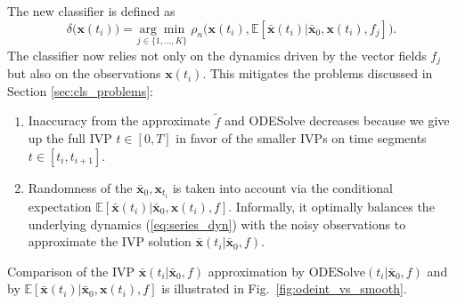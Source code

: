 \documentclass[referee, pdflatex, sn-mathphys-num]{sn-jnl}
\theoremstyle{definition}
\theoremstyle{plain}
\newcommand{\bx}{\ensuremath{\mathbf{x}}}
\newcommand{\bbx}{\ensuremath{\bar{\mathbf{x}}}}
\begin{document}
	The new classifier is defined as
	\begin{equation}\label{def:new_classifier}
		\delta \big( \bx(t_i) \big) = \underset{j \in \{1, \ldots, K\}}{\arg\min} \ \rho_n\big( \bx(t_i), \mathbb{E}[\bbx(t_i) | \bbx_0, \bx(t_i), f_j] \big).
	\end{equation}
	The classifier now relies not only on the dynamics driven by the vector fields $f_j$ but also on the observations $\bx(t_i)$. This mitigates the problems discussed in Section \ref{sec:cls_problems}:
	\begin{enumerate}
		\item Inaccuracy from the approximate $\tilde{f}$ and ODESolve decreases because we give up the full IVP $t \in [0, T]$ in favor of the smaller IVPs on time segments $t \in [t_i, t_{i+1}]$.
		\item Randomness of the $\bbx_0, \bx_{t_i}$ is taken into account via the conditional expectation $\mathbb{E}[\bbx(t_i) | \bbx_0, \bx(t_i), f]$. Informally, it optimally balances the underlying dynamics (\ref{eq:series_dyn}) with the noisy observations to approximate the IVP solution $\bbx(t_i | \bbx_0, f)$.
	\end{enumerate}
	
	Comparison of the IVP $\bbx(t_i | \bbx_0, f)$ approximation by $\text{ODESolve}(t_i | \bbx_0, f)$ and by $\mathbb{E}[\bbx(t_i) | \bbx_0, \bx(t_i), f]$ is illustrated in Fig.~\ref{fig:odeint_vs_smooth}.
	
\end{document}
